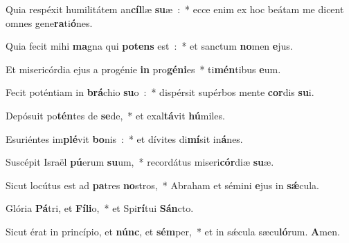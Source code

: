 ﻿\item Quia respéxit humilitátem an\textbf{cíl}læ \textbf{su}æ~:~* ecce enim ex hoc beátam me dicent omnes gene\textbf{ra}ti\textbf{ó}nes.
\item Quia fecit mihi \textbf{ma}gna qui \textbf{po}\textbf{tens} est~:~* et sanctum \textbf{no}men \textbf{e}jus.
\item Et misericórdia ejus a progénie \textbf{in} pro\textbf{gé}\textbf{ni}es~* ti\textbf{mén}tibus \textbf{e}um.
\item Fecit poténtiam in \textbf{brá}chio \textbf{su}o~:~* dispérsit supérbos mente \textbf{cor}dis \textbf{su}i.
\item Depósuit po\textbf{tén}tes de \textbf{se}de,~* et exal\textbf{tá}vit \textbf{hú}miles.
\item Esuriéntes im\textbf{plé}vit \textbf{bo}nis~:~* et dívites di\textbf{mí}sit in\textbf{á}nes.
\item Suscépit Israël \textbf{pú}erum \textbf{su}um,~* recordátus miseri\textbf{cór}diæ \textbf{su}æ.
\item Sicut locútus est ad \textbf{pa}tres \textbf{no}stros,~* Abraham et sémini \textbf{e}jus in \textbf{sǽ}cula.
\item Glória \textbf{Pá}tri, et \textbf{Fí}\textbf{li}o,~* et Spi\textbf{rí}tui \textbf{Sán}cto.
\item Sicut érat in princípio, et \textbf{núnc}, et \textbf{sém}per,~* et in sǽcula sæcu\textbf{ló}rum. \textbf{A}men.